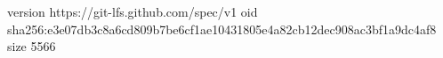 version https://git-lfs.github.com/spec/v1
oid sha256:e3e07db3c8a6cd809b7be6cf1ae10431805e4a82cb12dec908ac3bf1a9dc4af8
size 5566
